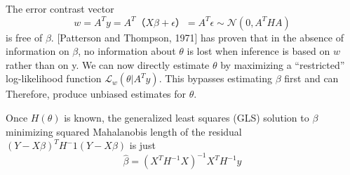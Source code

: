 \documentclass[a4paper,11pt]{article}
\begin{document}
The error contrast vector 
\begin{equation}\label{eq1} 
         w = A^T y = A^T（X \beta + \epsilon）= A^T \epsilon \sim \mathcal{N}(0,A^T H A)
\end{equation}
 is free of $\beta$. [Patterson and Thompson, 1971] has proven that in the absence of information on $\beta$, no information about $\theta$ is lost when inference is based on $w$ rather than on y. We can now directly estimate $\theta$ by maximizing a “restricted” log-likelihood function $ {\mathcal{L}}_w (\theta| A^T y)$. This bypasses estimating $\beta$ first and can Therefore, produce unbiased estimates for $\theta$.

Once $H(\theta)$ is known, the generalized least squares (GLS) solution to $\beta$ minimizing squared Mahalanobis length of the residual $(Y - X\beta)^T H^-1(Y - X\beta)$ is just
\begin{equation}\label{eq:mean} 
         \widehat{\beta} = (X^T H^{-1} X)^{-1} X^T H^{-1} y
\end{equation}
\end{document}
